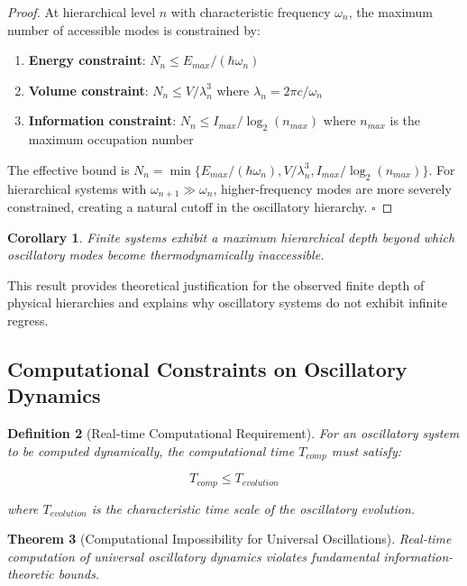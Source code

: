 \documentclass[11pt]{article}
\newtheorem{theorem}{Theorem}[section]
\newtheorem{corollary}[theorem]{Corollary}
\newtheorem{definition}[theorem]{Definition}
\theoremstyle{remark}
\begin{document}
\begin{proof}
At hierarchical level $n$ with characteristic frequency $\omega_n$, the maximum number of accessible modes is constrained by:

\begin{enumerate}
\item \textbf{Energy constraint}: $N_n \leq E_{max}/(\hbar\omega_n)$
\item \textbf{Volume constraint}: $N_n \leq V/\lambda_n^3$ where $\lambda_n = 2\pi c/\omega_n$
\item \textbf{Information constraint}: $N_n \leq I_{max}/\log_2(n_{max})$ where $n_{max}$ is the maximum occupation number
\end{enumerate}

The effective bound is $N_n = \min\{E_{max}/(\hbar\omega_n), V/\lambda_n^3, I_{max}/\log_2(n_{max})\}$. For hierarchical systems with $\omega_{n+1} \gg \omega_n$, higher-frequency modes are more severely constrained, creating a natural cutoff in the oscillatory hierarchy. $\square$
\end{proof}

\begin{corollary}
Finite systems exhibit a maximum hierarchical depth beyond which oscillatory modes become thermodynamically inaccessible.
\end{corollary}

This result provides theoretical justification for the observed finite depth of physical hierarchies and explains why oscillatory systems do not exhibit infinite regress.

\subsection{Computational Constraints on Oscillatory Dynamics}

\begin{definition}[Real-time Computational Requirement]
For an oscillatory system to be computed dynamically, the computational time $T_{comp}$ must satisfy:

$$T_{comp} \leq T_{evolution}$$

where $T_{evolution}$ is the characteristic time scale of the oscillatory evolution.
\end{definition}

\begin{theorem}[Computational Impossibility for Universal Oscillations]
Real-time computation of universal oscillatory dynamics violates fundamental information-theoretic bounds.
\end{theorem}
\end{document}
